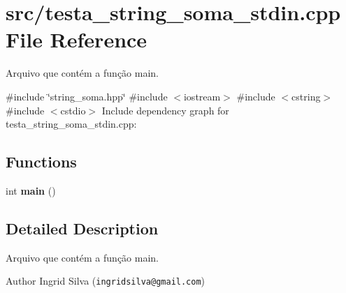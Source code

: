 \section{src/testa\+\_\+string\+\_\+soma\+\_\+stdin.cpp File Reference}
\label{testa__string__soma__stdin_8cpp}


Arquivo que contém a função main.  


{\ttfamily \#include \char`\"{}string\+\_\+soma.\+hpp\char`\"{}}\newline
{\ttfamily \#include $<$iostream$>$}\newline
{\ttfamily \#include $<$cstring$>$}\newline
{\ttfamily \#include $<$cstdio$>$}\newline
Include dependency graph for testa\+\_\+string\+\_\+soma\+\_\+stdin.\+cpp\+:
\subsection*{Functions}
\begin{DoxyCompactItemize}
\item 
\mbox{\label{testa__string__soma__stdin_8cpp_ae66f6b31b5ad750f1fe042a706a4e3d4}} 
int {\bfseries main} ()
\end{DoxyCompactItemize}


\subsection{Detailed Description}
Arquivo que contém a função main. 

\begin{DoxyAuthor}{Author}
Ingrid Silva ({\tt ingridsilva@gmail.\+com}) 
\end{DoxyAuthor}
